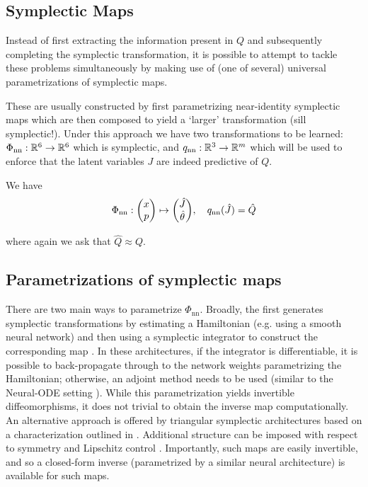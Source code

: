 \documentclass{article}
\begin{document}
\subsection{Symplectic Maps}

Instead of first extracting the information present in $Q$ and subsequently completing the symplectic transformation, it is possible to attempt to tackle these problems simultaneously by making use of (one of several) universal parametrizations of symplectic maps.

These are usually constructed by first parametrizing near-identity symplectic maps which are then composed to yield a `larger' transformation (sill symplectic!). Under this approach we have two transformations to be learned: $\Phi_\text{nn}:\mathbb{R}^6\to\mathbb{R}^6$ which is symplectic, and $q_\text{nn}:\mathbb{R}^3\to\mathbb{R}^m$ which will be used to enforce that the latent variables $J$ are indeed predictive of $Q$.

We have
\begin{align*}
    \Phi_\text{nn}:\mqty(x\\p)\mapsto\mqty(\hat{J}\\\hat{\theta})\qc q_\text{nn}(\hat{J})=\hat{Q}
\end{align*}

where again we ask that $\hat{Q}\approx Q$.

\subsection{Parametrizations of symplectic maps}

There are two main ways to parametrize $\Phi_\text{nn}$. Broadly, the first generates symplectic transformations by estimating a Hamiltonian (e.g. using a smooth neural network) and then using a symplectic integrator to construct the corresponding map \cite{greydanus2019hamiltonian,bertalan2019learning}. In these architectures, if the integrator is differentiable, it is possible to back-propagate through to the network weights parametrizing the Hamiltonian; otherwise, an adjoint method needs to be used (similar to the Neural-ODE setting \cite{chen2018neuralODE}). While this parametrization yields invertible diffeomorphisms, it does not trivial  to obtain the inverse map computationally.  An alternative approach is offered by triangular symplectic architectures \cite{burby2020fast,jin2020sympnets} based on a characterization outlined in \cite{turaev2002polynomial}. Additional structure can be imposed with respect to symmetry \cite{duruisseaux2023approximation} and Lipschitz control \cite{kevrekidis2024neural}. Importantly, such maps are easily invertible, and so a closed-form inverse (parametrized by a similar neural architecture) is available for such maps. 



\end{document}
